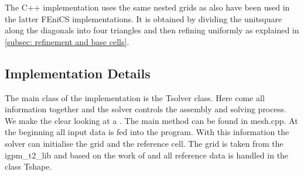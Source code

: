 The C++ implementation uses the same nested grids as also have been used in the latter FEniCS implementations. It is obtained by dividing the unitsquare along the diagonals into four triangles and then refining uniformly as explained in \ref{subsec: refinement and base cells}.

\subsection{Implementation Details}

The main class of the implementation is the Tsolver class. Here come all information together and the solver controls the assembly and solving process. 
We make the clear looking at a . The main method can be found in mesh.cpp. At the beginning all input data is fed into the program. With this information the solver can initialise the grid and the reference cell. 
The grid is taken from the igpm\_t2\_lib and based on the work of \cite{BMV2009} and all reference data is handled in the class Tshape.

